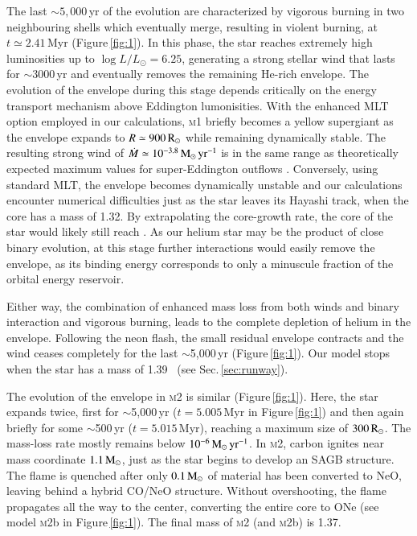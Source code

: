 \documentclass[twocolumn]{aa}
\begin{document}
The last $\sim 5,000$\,yr of the evolution are characterized by vigorous burning in two neighbouring shells which eventually merge, resulting in violent burning, at $t\simeq 2.41$\,Myr (Figure\,\ref{fig:1}). In this phase, the star reaches extremely high luminosities up to $\log{L/L_\odot = 6.25}$, generating   a strong stellar wind that lasts for $\sim3000$\,yr and  eventually removes the remaining He-rich envelope.
The evolution of the envelope during this stage 
depends critically on the energy transport mechanism above Eddington lumonisities. With the enhanced MLT option 
employed in our calculations,  \textsc{m1} briefly 
becomes a yellow supergiant as the envelope  expands to $R\simeq 900\mathrm{\,R_\odot}$ while remaining dynamically stable.
The resulting strong wind of $\dot{M}\simeq10^{-3.8}\mathrm{\,M_{\odot}\,yr^{-1}}$  is in the same range as theoretically expected maximum values for super-Eddington outflows \citep[][]{Owocki:2004zz,Smith2006}.
Conversely, using standard MLT, the envelope becomes dynamically unstable and our calculations encounter numerical difficulties just as the star leaves its Hayashi track, when the core has a mass of 1.32\msun.
By extrapolating the core-growth rate, the core of the star would likely still reach \mch. 
As our helium star may be the product of close binary evolution, at this stage further interactions would easily remove the envelope, as its binding energy corresponds to only a minuscule fraction of the orbital energy reservoir. 

Either way, the combination of enhanced mass loss  from both winds and binary interaction and vigorous burning, leads to the complete depletion of helium in the envelope. 
Following the neon flash, the small residual envelope contracts and the wind ceases completely for the last $\sim$5,000\,yr (Figure\,\ref{fig:1}). Our model stops when the star has a mass of 1.39\msun~ (see Sec.\,\ref{sec:runway}).  

The evolution of the envelope in \textsc{m2} is similar (Figure\,\ref{fig:1}). Here, 
the star expands twice, first for $\sim$5,000\,yr ($t=5.005$\,Myr in Figure\,\ref{fig:1}) and then again  briefly for some 
$\sim$500\,yr ($t=5.015$\,Myr), reaching a maximum size of $300\mathrm{\,R_\odot}$. The mass-loss rate mostly remains 
below $10^{-6}\mathrm{\,M_{\odot}\,yr^{-1}}$. In \textsc{m2}, carbon ignites near mass coordinate $1.1\mathrm{\,M_\odot}$, 
just as the star begins to develop an SAGB structure. The flame is quenched after only 
$0.1\mathrm{\,M_\odot}$ of material has been converted to NeO, leaving behind a hybrid CO/NeO structure. Without overshooting, the flame propagates all the way to the center, converting the entire core to ONe (see model \textsc{m2}b in Figure\,\ref{fig:1}). The final mass of \textsc{m2} (and \textsc{m2}b) is 1.37\msun. 
\end{document}
